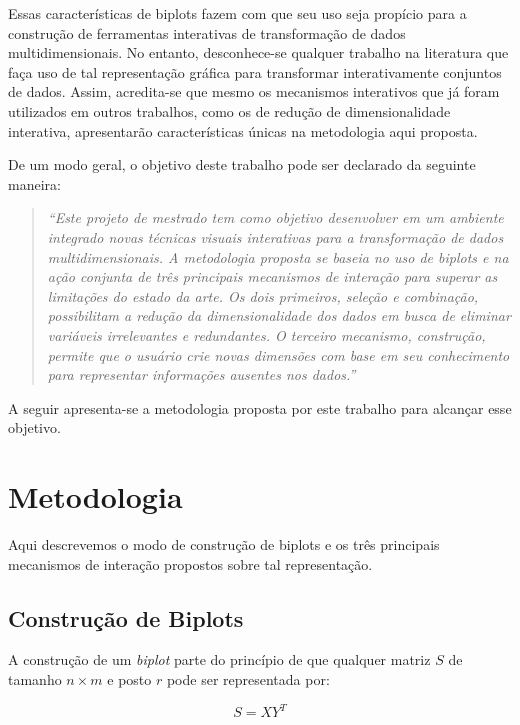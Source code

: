 Essas características de biplots fazem com que seu uso seja
propício para a construção de ferramentas interativas de
transformação de dados multidimensionais. No entanto,
desconhece-se qualquer trabalho na literatura que faça uso
de tal representação gráfica para transformar
interativamente conjuntos de dados. Assim, acredita-se que
mesmo os mecanismos interativos que já foram utilizados em
outros trabalhos, como os de redução de dimensionalidade
interativa, apresentarão características únicas na
metodologia aqui proposta.

De um modo geral, o objetivo deste trabalho pode ser
declarado da seguinte maneira:

\begin{quote} \emph{``Este projeto de mestrado tem como
        objetivo desenvolver em um ambiente integrado novas
        técnicas visuais interativas para a transformação de
        dados multidimensionais. A metodologia proposta se
        baseia no uso de biplots e na ação conjunta de três
        principais mecanismos de interação para superar as
        limitações do estado da arte. Os dois primeiros,
        seleção e combinação, possibilitam a redução da
        dimensionalidade dos dados em busca de eliminar
        variáveis irrelevantes e redundantes. O terceiro
        mecanismo, construção, permite que o usuário crie
        novas dimensões com base em seu conhecimento para
        representar informações ausentes nos dados.''}
\end{quote}

A seguir apresenta-se a metodologia proposta por este
trabalho para alcançar esse objetivo. 

\section{Metodologia}

Aqui descrevemos o modo de construção de biplots e os três
principais mecanismos de interação propostos sobre tal
representação. 

\subsection{Construção de Biplots}

A construção de um \emph{biplot} parte do princípio de que qualquer
matriz $S$ de tamanho $n \times m$ e posto $r$  pode
ser representada por:

\begin{equation}\label{eq:bp}
    S = XY^T
\end{equation}

